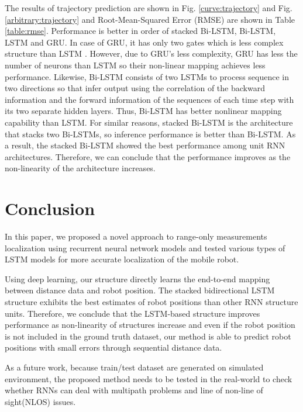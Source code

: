 \documentclass[letterpaper, 10 pt, conference]{ieeeconf}  %
\begin{document}
The results of trajectory prediction are shown in Fig. \ref{curve:trajectory} and Fig. \ref{arbitrary:trajectory} and Root-Mean-Squared Error (RMSE) are shown in Table \ref{table:rmse}. Performance is better in order of stacked Bi-LSTM, Bi-LSTM, LSTM and GRU. In case of GRU, it has only two gates which is less complex structure than LSTM \cite{chung2014empirical}. However, due to GRU's less complexity, GRU has less the number of neurons than LSTM so their non-linear mapping achieves less performance. Likewise, Bi-LSTM consists of two LSTMs to process sequence in two directions so that infer output using the correlation of the backward information and the forward information of the sequences of each time step with its two separate hidden layers. Thus, Bi-LSTM has better nonlinear mapping capability than LSTM. For similar reasons, stacked Bi-LSTM is the architecture that stacks two Bi-LSTMs, so inference performance is better than Bi-LSTM. As a result, the stacked Bi-LSTM showed the best performance among unit RNN architectures. Therefore, we can conclude that the performance improves as the non-linearity of the architecture increases.


\section{Conclusion}

In this paper, we proposed a novel approach to range-only measurements localization using recurrent neural network models and tested various types of LSTM models for more accurate localization of the mobile robot. 

Using deep learning, our structure directly learns the end-to-end mapping between distance data and robot position. The stacked bidirectional LSTM structure exhibits the best estimates of robot positions than other RNN structure units. Therefore, we conclude that  the LSTM-based structure improves performance as non-linearity of structures increase and even if the robot position is not included in the ground truth dataset, our method is able to predict robot positions with small errors through sequential distance data. 

As a future work, because train/test dataset are generated on simulated environment, the proposed method needs to be tested in the real-world to check whether RNNs can deal with multipath problems and line of non-line of sight(NLOS) issues.


\end{document}
